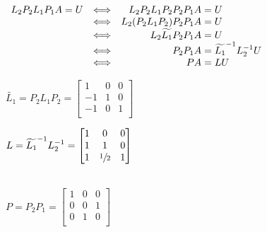 \documentclass[12pt]{article}
\begin{document}
{
$
    \begin{array}{rrr@{}l}
        L_2 P_2 L_1P_1A = U
         & \Longleftrightarrow & L_2 P_2 L_1P_2P_2P_1A      & {}= U                               \\
         & \Longleftrightarrow & L_2 (P_2 L_1P_2)P_2P_1A    & {}= U                               \\
         & \Longleftrightarrow & L_2 \widetilde{L_1}P_2P_1A & {}= U                               \\
         & \Longleftrightarrow & P_2P_1A                    & {}= \widetilde{L_1}^{-1} L_2^{-1} U \\
         & \Longleftrightarrow & PA                         & {}= L U                             \\
    \end{array}
$
}\newpage

\begin{minipage}[t]{0.5\textwidth}
    $
        \widetilde{L_1} = P_2 L_1P_2 =
        \begin{bmatrix}
            1  & 0 & 0 \\
            -1 & 1 & 0 \\
            -1 & 0 & 1 \\
        \end{bmatrix}
    $
\end{minipage}
\begin{minipage}[t]{0.5\textwidth}
    $
        L = \widetilde{L_1}^{-1} L_2^{-1} =
        \begin{bmatrix}
            1 & 0            & 0 \\
            1 & 1            & 0 \\
            1 & \sfrac{1}{2} & 1 \\
        \end{bmatrix}
    $
\end{minipage}\\





$
    P = P_2P_1 =
    \begin{bmatrix}
        1 & 0 & 0 \\
        0 & 0 & 1 \\
        0 & 1 & 0 \\
    \end{bmatrix}
$\\
\end{document}
